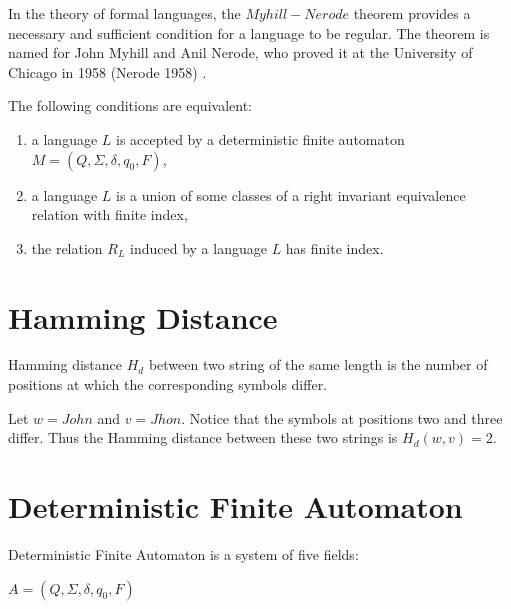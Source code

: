 \documentclass{mini}
\begin{document}
In the theory of formal languages, the $Myhill-Nerode$ theorem provides a necessary and sufficient condition for a language to be regular. The theorem is named for John Myhill and Anil Nerode, who proved it at the University of Chicago in 1958 (Nerode 1958) \cite{Myhill_Nerode}.

\begin{theorem}\label{Theorem:Myhill_Nerode}
    The following conditions are equivalent:
    \begin{enumerate}
        \item a language $L$ is accepted by a deterministic finite automaton $M = (Q,\Sigma,\delta,q_0,F)$,
        \item a language $L$ is a union of some classes of a right invariant equivalence relation with finite index,
        \item the relation $R_{L}$ induced by a language $L$ has finite index.
    \end{enumerate}
\end{theorem}

\section{Hamming Distance} \label{sec:hamming}

\begin{definition}
Hamming distance $H_d$ between two string of the same length is the number of positions at which the corresponding symbols differ.
\end{definition}

\begin{example} 
Let $w = John$ and $v = Jhon$. Notice that the symbols at positions two and three differ. Thus the Hamming distance between these two strings is $H_d(w,v) = 2$.
\end{example}


\section{Deterministic Finite Automaton} \label{sec:autom}
Deterministic Finite Automaton is a system of five fields:
\begin{center}
    $A = (Q, \Sigma, \delta, q_0, F)$
\end{center}
\end{document}
